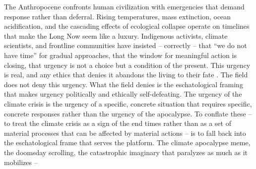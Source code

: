 The Anthropocene confronts human civilization with emergencies that demand response rather than deferral. Rising temperatures, mass extinction, ocean acidification, and the cascading effects of ecological collapse operate on timelines that make the Long Now seem like a luxury. Indigenous activists, climate scientists, and frontline communities have insisted – correctly – that “we do not have time” for gradual approaches, that the window for meaningful action is closing, that urgency is not a choice but a condition of the present. This urgency is real, and any ethics that denies it abandons the living to their fate \cite[pp.~1-20]{stengers_2015}. The field does not deny this urgency. What the field denies is the eschatological framing that makes urgency politically and ethically self-defeating. The urgency of the climate crisis is the urgency of a specific, concrete situation that requires specific, concrete responses rather than the urgency of the apocalypse. To conflate these – to treat the climate crisis as a sign of the end times rather than as a set of material processes that can be affected by material actions – is to fall back into the eschatological frame that serves the platform. The climate apocalypse meme, the doomsday scrolling, the catastrophic imaginary that paralyzes as much as it mobilizes –


